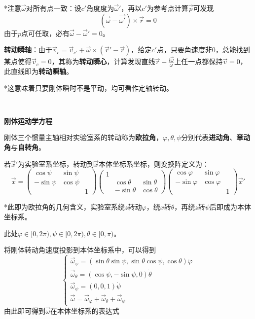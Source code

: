 \documentclass[a4paper,UTF8,fontset=windows]{ctexart}
\begin{document}
*注意$\vec{\omega}$对所有点一致：设$c'$角度度为$\vec{\omega}'$，再以$c'$为参考点计算$\vec{p}$可发现
$$(\vec{\omega}-\vec{\omega'})\times\vec{r}=0$$
由于$p$点可任取，必有$\vec{\omega}-\vec{\omega}'=0$。

\textbf{转动瞬轴}：由于$\vec{v}_c=\vec{v}_{c'}+\vec{\omega}\times(\vec{r}'-\vec{r})$，给定$c'$点，只要角速度非0，总能找到某点使得$\vec{v}_c=0$，其称为\textbf{转动瞬心}，计算发现直线$\vec{r}+\frac{l\vec{\omega}}{\omega}$上任一点都保持$\vec{v}=0$，此直线即为\textbf{转动瞬轴}。

*这意味着只要刚体瞬时不是平动，均可看作定轴转动。

\

\textbf{刚体运动学方程}

刚体三个惯量主轴相对实验室系的转动称为\textbf{欧拉角}，$\varphi,\theta,\psi$分别代表\textbf{进动角}、\textbf{章动角}与\textbf{自转角}。

若$\vec{x}'$为实验室系坐标，转动到$\vec{x}$本体坐标系坐标，则变换阵定义为：
$$\vec{x}=\begin{pmatrix}\cos\psi&\sin\psi&\\-\sin\psi&\cos\psi&\\ &&1\end{pmatrix}\begin{pmatrix}1&&\\ &\cos\theta&\sin\theta\\ &-\sin\theta&\cos\theta\end{pmatrix}\begin{pmatrix}\cos\varphi&\sin\varphi&\\-\sin\varphi&\cos\varphi&\\ &&1\end{pmatrix}\vec{x}'$$

*此即为欧拉角的几何含义，实验室系绕$z$转动$\varphi$，绕$x$转$\theta$，再绕$z$转$\psi$后即成为本体坐标系。

此处$\varphi\in[0,2\pi),\psi\in[0,2\pi),\theta\in[0,\pi)$。

将刚体转动角速度投影到本体坐标系中，可以得到
$$\begin{cases}\vec{\omega}_\varphi=(\sin\theta\sin\psi,\sin\theta\cos\psi,\cos\theta)\dot\varphi\\\vec{\omega}_\theta=(\cos\psi,-\sin\psi,0)\dot{\theta}\\\vec{\omega}_\psi=(0,0,1)\dot{\psi}\\\vec{\omega}=\vec{\omega}_{\varphi}+\vec{\omega}_\theta+\vec{\omega}_\psi\end{cases}$$
由此即可得到$\vec{\omega}$在本体坐标系的表达式
\end{document}

